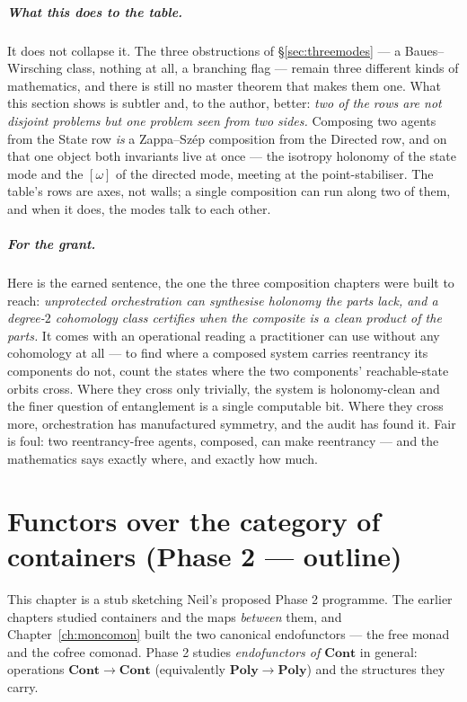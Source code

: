 \documentclass[11pt,a4paper]{book}
\newcommand{\Cont}{\mathbf{Cont}}
\newcommand{\Poly}{\mathbf{Poly}}
\theoremstyle{plain}
\theoremstyle{definition}
\theoremstyle{remark}
\begin{document}
\paragraph{What this does to the table.} It does not collapse it. The three obstructions
of \S\ref{sec:threemodes} --- a Baues--Wirsching class, nothing at all, a branching flag
--- remain three different kinds of mathematics, and there is still no master theorem
that makes them one. What this section shows is subtler and, to the author, better:
\emph{two of the rows are not disjoint problems but one problem seen from two sides.}
Composing two agents from the State row \emph{is} a Zappa--Sz\'ep composition from the
Directed row, and on that one object both invariants live at once --- the isotropy
holonomy of the state mode and the $[\omega]$ of the directed mode, meeting at the
point-stabiliser. The table's rows are axes, not walls; a single composition can run
along two of them, and when it does, the modes talk to each other.

\paragraph{For the grant.} Here is the earned sentence, the one the three composition
chapters were built to reach: \emph{unprotected orchestration can synthesise holonomy
the parts lack, and a degree-$2$ cohomology class certifies when the composite is a
clean product of the parts.} It comes with an operational reading a practitioner can
use without any cohomology at all --- to find where a composed system carries reentrancy
its components do not, count the states where the two components' reachable-state orbits
cross. Where they cross only trivially, the system is holonomy-clean and the finer
question of entanglement is a single computable bit. Where they cross more, orchestration
has manufactured symmetry, and the audit has found it. Fair is foul: two reentrancy-free
agents, composed, can make reentrancy --- and the mathematics says exactly where, and
exactly how much.

\chapter{Functors over the category of containers (Phase 2 --- outline)}
\label{ch:phase2}

This chapter is a stub sketching Neil's proposed Phase 2 programme. The earlier chapters
studied containers and the maps \emph{between} them, and Chapter~\ref{ch:moncomon} built the
two canonical endofunctors --- the free monad and the cofree comonad. Phase 2 studies
\emph{endofunctors of $\Cont$} in general: operations $\Cont\to\Cont$ (equivalently
$\Poly\to\Poly$) and the structures they carry.
\end{document}
